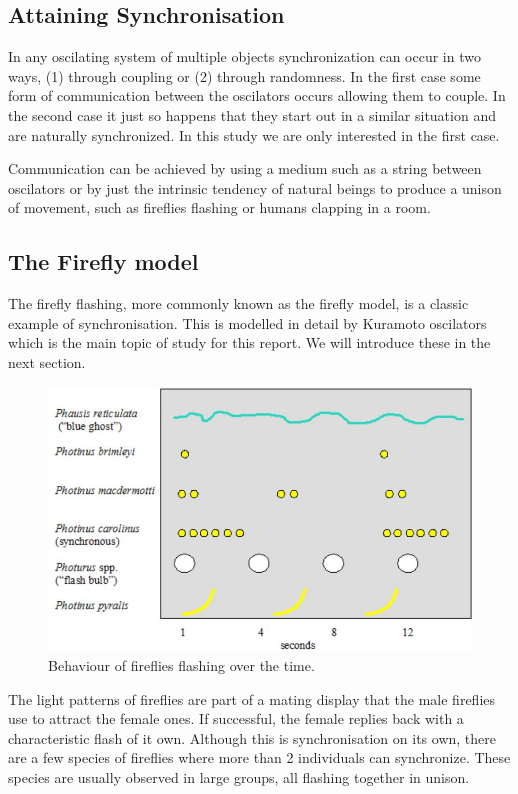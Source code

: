 \subsection{Attaining Synchronisation}

In any oscilating system of multiple objects synchronization can occur in two ways, (1) through coupling or (2) through randomness. In the first case some form of communication between the oscilators occurs allowing them to couple. In the second case it just so happens that they start out in a similar situation and are naturally synchronized. In this study we are only interested in the first case. 

Communication can be achieved by using a medium such as a string between oscilators or by just the intrinsic tendency of natural beings to produce a unison of movement, such as fireflies flashing or humans clapping in a room. 

\subsection{The Firefly model}

The firefly flashing, more commonly known as the firefly model, is a classic example of synchronisation. This is modelled in detail by Kuramoto oscilators which is the main topic of study for this report. We will introduce these in the next section. 

\begin{figure}[h]
	\centering
	\includegraphics[width=\textwidth]{imgs/flash}
	\caption{Behaviour of fireflies flashing over the time. }
	\label{fig:intro_flash}
\end{figure}
 
The light patterns of fireflies are part of a mating display that the male fireflies use to attract the female ones. If successful, the female replies back with a characteristic flash of it own. Although this is synchronisation on its own, there are a few species of fireflies where more than 2 individuals can synchronize. These species are usually observed in large groups, all flashing together in unison.

